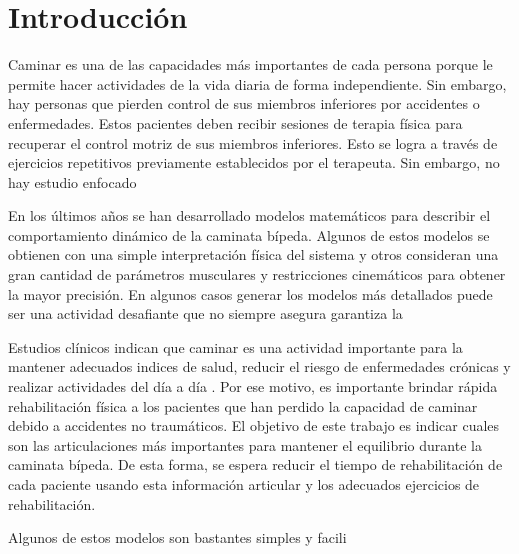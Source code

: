 
\section{Introducción}
Caminar es una de las capacidades más importantes de cada persona porque le permite hacer actividades de la vida diaria de forma independiente. Sin embargo, hay personas que pierden control de sus miembros inferiores por accidentes o enfermedades. Estos pacientes deben recibir sesiones de terapia física para recuperar el control motriz de sus miembros inferiores. Esto se logra a través de ejercicios repetitivos previamente establecidos por el terapeuta. Sin embargo, no hay estudio enfocado 



En los últimos años se han desarrollado modelos matemáticos para describir el comportamiento dinámico de la caminata bípeda. Algunos de estos modelos se obtienen con una simple interpretación física del sistema y otros consideran una gran cantidad de parámetros musculares y restricciones cinemáticos para obtener la mayor precisión. En algunos casos generar los modelos más detallados puede ser una actividad desafiante que no siempre asegura garantiza la 


Estudios clínicos indican que caminar es una actividad importante para la mantener adecuados indices de salud, reducir el riesgo de enfermedades crónicas y realizar actividades del día a día \cite{lee2008importance}. Por ese motivo, es importante brindar rápida rehabilitación física a los pacientes que han perdido la capacidad de caminar debido a accidentes no traumáticos. El objetivo de este trabajo es indicar cuales son las articulaciones más importantes para mantener el equilibrio durante la caminata bípeda. De esta forma, se espera reducir el tiempo de rehabilitación de cada paciente usando esta información articular y los adecuados ejercicios de rehabilitación.










Algunos de estos modelos son bastantes simples y facili